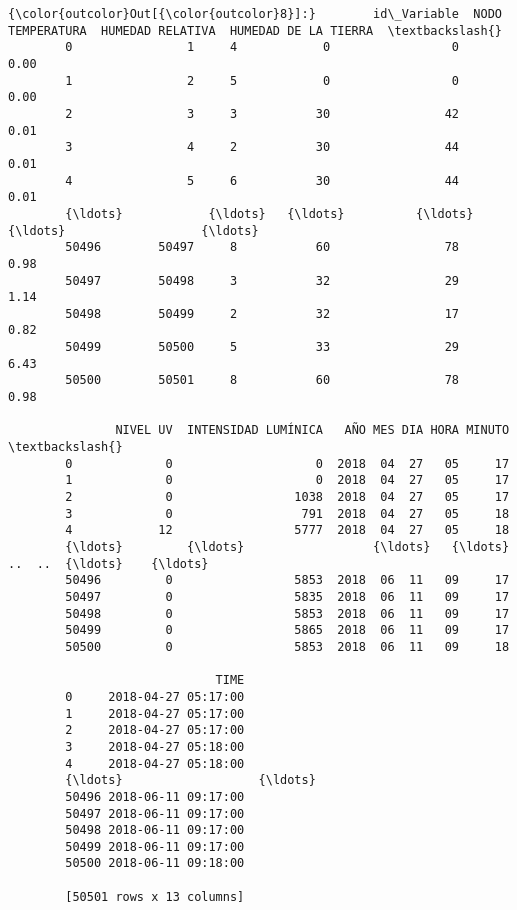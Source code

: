 \documentclass[11pt]{article}
\begin{document}
\begin{Verbatim}[commandchars=\\\{\}]
{\color{outcolor}Out[{\color{outcolor}8}]:}        id\_Variable  NODO  TEMPERATURA  HUMEDAD RELATIVA  HUMEDAD DE LA TIERRA  \textbackslash{}
        0                1     4            0                 0                  0.00   
        1                2     5            0                 0                  0.00   
        2                3     3           30                42                  0.01   
        3                4     2           30                44                  0.01   
        4                5     6           30                44                  0.01   
        {\ldots}            {\ldots}   {\ldots}          {\ldots}               {\ldots}                   {\ldots}   
        50496        50497     8           60                78                  0.98   
        50497        50498     3           32                29                  1.14   
        50498        50499     2           32                17                  0.82   
        50499        50500     5           33                29                  6.43   
        50500        50501     8           60                78                  0.98   
        
               NIVEL UV  INTENSIDAD LUMÍNICA   AÑO MES DIA HORA MINUTO  \textbackslash{}
        0             0                    0  2018  04  27   05     17   
        1             0                    0  2018  04  27   05     17   
        2             0                 1038  2018  04  27   05     17   
        3             0                  791  2018  04  27   05     18   
        4            12                 5777  2018  04  27   05     18   
        {\ldots}         {\ldots}                  {\ldots}   {\ldots}  ..  ..  {\ldots}    {\ldots}   
        50496         0                 5853  2018  06  11   09     17   
        50497         0                 5835  2018  06  11   09     17   
        50498         0                 5853  2018  06  11   09     17   
        50499         0                 5865  2018  06  11   09     17   
        50500         0                 5853  2018  06  11   09     18   
        
                             TIME  
        0     2018-04-27 05:17:00  
        1     2018-04-27 05:17:00  
        2     2018-04-27 05:17:00  
        3     2018-04-27 05:18:00  
        4     2018-04-27 05:18:00  
        {\ldots}                   {\ldots}  
        50496 2018-06-11 09:17:00  
        50497 2018-06-11 09:17:00  
        50498 2018-06-11 09:17:00  
        50499 2018-06-11 09:17:00  
        50500 2018-06-11 09:18:00  
        
        [50501 rows x 13 columns]
\end{Verbatim}
            
\end{document}
